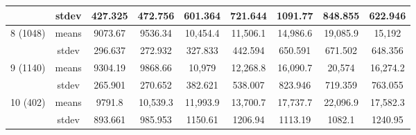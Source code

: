 \documentclass[jmse,article,accept,pdftex,oneauthor]{Definitions/mdpi}
\begin{document}
\begin{table}[H]
\begin{tabular}{ccccccccc}
    & stdev & 427.325 & 472.756 & 601.364 & 721.644 & 1091.77 & 848.855 & 622.946 \\
    \midrule
    \multirow{2}{*}{8 (1048)} & means & 9073.67 & 9536.34 & 10,454.4 & 11,506.1 & 14,986.6 & 19,085.9 & 15,192 \\
    & stdev & 296.637 & 272.932 & 327.833 & 442.594 & 650.591 & 671.502 & 648.356 \\
    \midrule
    \multirow{2}{*}{9 (1140)} & means & 9304.19 & 9868.66 & 10,979 & 12,268.8 & 16,090.7 & 20,574 & 16,274.2 \\
    & stdev & 265.901 & 270.652 & 382.621 & 538.007 & 823.946 & 719.359 & 763.055 \\
    \midrule
    \multirow{2}{*}{10 (402)} & means & 9791.8 & 10,539.3 & 11,993.9 & 13,700.7 & 17,737.7 & 22,096.9 & 17,582.3 \\
    & stdev & 893.661 & 985.953 & 1150.61 & 1206.94 & 1113.19 & 1082.1 &1240.95 \\

\bottomrule
\end{tabular}

\end{table}
\end{document}
